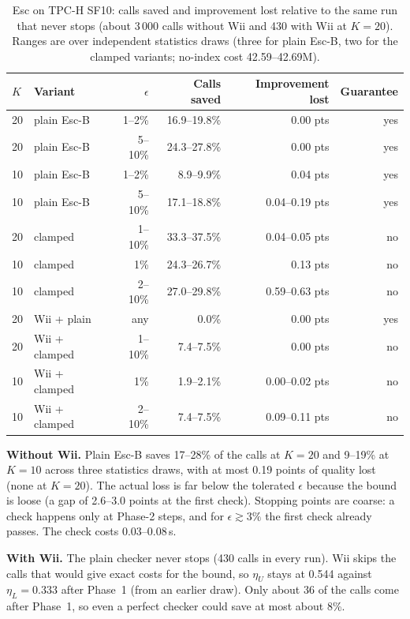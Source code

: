 \documentclass[11pt,a4paper]{article}
\begin{document}
\begin{table}[h]\centering\small
\begin{tabular}{llrrrr}\toprule
$K$ & Variant & $\epsilon$ & Calls saved & Improvement lost & Guarantee\\\midrule
20 & plain Esc-B & 1--2\% & 16.9--19.8\% & 0.00 pts & yes\\
20 & plain Esc-B & 5--10\% & 24.3--27.8\% & 0.00 pts & yes\\
10 & plain Esc-B & 1--2\% & 8.9--9.9\% & 0.04 pts & yes\\
10 & plain Esc-B & 5--10\% & 17.1--18.8\% & 0.04--0.19 pts & yes\\
20 & clamped & 1--10\% & 33.3--37.5\% & 0.04--0.05 pts & no\\
10 & clamped & 1\% & 24.3--26.7\% & 0.13 pts & no\\
10 & clamped & 2--10\% & 27.0--29.8\% & 0.59--0.63 pts & no\\
20 & Wii + plain & any & 0.0\% & 0.00 pts & yes\\
20 & Wii + clamped & 1--10\% & 7.4--7.5\% & 0.00 pts & no\\
10 & Wii + clamped & 1\% & 1.9--2.1\% & 0.00--0.02 pts & no\\
10 & Wii + clamped & 2--10\% & 7.4--7.5\% & 0.09--0.11 pts & no\\\bottomrule
\end{tabular}
\caption{Esc on TPC-H SF10: calls saved and improvement lost relative to the same run that never stops (about 3\,000 calls without Wii and 430 with Wii at $K=20$). Ranges are over independent statistics draws (three for plain Esc-B, two for the clamped variants; no-index cost 42.59--42.69M).}\label{tab:esc}
\end{table}

\textbf{Without Wii.} Plain Esc-B saves 17--28\% of the calls at $K=20$ and 9--19\% at $K=10$ across three statistics draws, with at most 0.19 points of quality lost (none at $K=20$). The actual loss is far below the tolerated $\epsilon$ because the bound is loose (a gap of 2.6--3.0 points at the first check). Stopping points are coarse: a check happens only at Phase-2 steps, and for $\epsilon\gtrsim3\%$ the first check already passes. The check costs 0.03--0.08\,s.

\textbf{With Wii.} The plain checker never stops (430 calls in every run). Wii skips the calls that would give exact costs for the bound, so $\eta_U$ stays at 0.544 against $\eta_L=0.333$ after Phase~1 (from an earlier draw). Only about 36 of the calls come after Phase~1, so even a perfect checker could save at most about 8\%.
\end{document}
